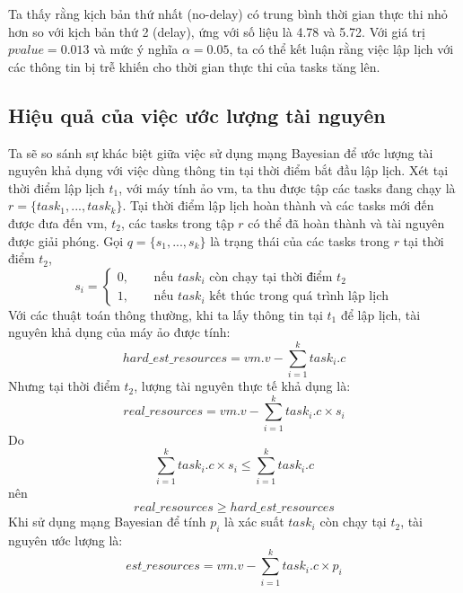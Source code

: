 \documentclass{my_style}
\begin{document}
\noindent
Ta thấy rằng kịch bản thứ nhất (no-delay) có trung bình thời gian thực thi nhỏ hơn so với kịch bản thứ 2 (delay), ứng với số liệu là 4.78 và 5.72. Với giá trị $pvalue = 0.013$ và mức ý nghĩa $\alpha = 0.05$, ta có thể kết luận rằng việc lập lịch với các thông tin bị trễ khiến cho thời gian thực thi của tasks tăng lên. 

\subsection{Hiệu quả của việc ước lượng tài nguyên}
Ta sẽ so sánh sự khác biệt giữa việc sử dụng mạng Bayesian để ước lượng tài nguyên khả dụng với việc dùng thông tin tại thời điểm bắt đầu lập lịch. Xét tại thời điểm lập lịch $t_{1}$, với máy tính ảo vm, ta thu được tập các tasks đang chạy là $r = \{task_{1}, ..., task_{k}\}$. Tại thời điểm lập lịch hoàn thành và các tasks mới đến được đưa đến vm, $t_{2}$, các tasks trong tập $r$ có thể đã hoàn thành và tài nguyên được giải phóng. Gọi $q = \{s_{1}, ..., s_{k}\}$ là trạng thái của các tasks trong $r$ tại thời điểm $t_{2}$, 
\[
s_{i} = 
	\begin{cases}
		\text{0, } &\quad\text{nếu $task_{i}$ còn chạy tại thời điểm $t_{2}$} \\
		\text{1, } &\quad\text{nếu $task_{i}$ kết thúc trong quá trình lập lịch}
	\end{cases}
\]
Với các thuật toán thông thường, khi ta lấy thông tin tại $t_{1}$ để lập lịch, tài nguyên khả dụng của máy ảo được tính: 
\begin{equation}
	hard\_est\_resources = vm.v - \sum_{i = 1}^{k}task_{i}.c
\end{equation}
Nhưng tại thời điểm $t_{2}$, lượng tài nguyên thực tế khả dụng là: 
\begin{equation}
	real\_resources = vm.v - \sum_{i = 1}^{k}task_{i}.c \times s_{i}
\end{equation}
Do 
\begin{equation*}
	\sum_{i = 1}^{k}task_{i}.c \times s_{i} \leq \sum_{i = 1}^{k}task_{i}.c
\end{equation*}
nên 
\begin{equation} \label{equ:1}
	real\_resources \geq hard\_est\_resources
\end{equation}
Khi sử dụng mạng Bayesian để tính $p_{i}$ là xác suất $task_{i}$ còn chạy tại $t_{2}$, tài nguyên ước lượng là: 
\begin{equation}
	est\_resources = vm.v - \sum_{i = 1}^{k}task_{i}.c \times p_{i}
\end{equation}
\end{document}
